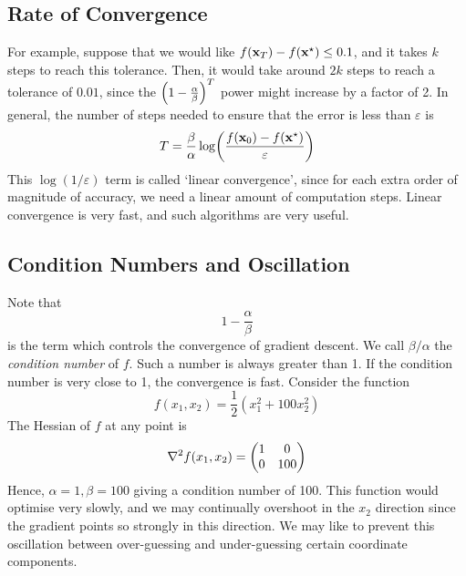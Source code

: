 \subsection{Rate of Convergence}
For example, suppose that we would like \(f(\vb x_T)  - f(\vb x^\star) \leq 0.1\), and it takes \(k\) steps to reach this tolerance.
Then, it would take around \(2k\) steps to reach a tolerance of \(0.01\), since the \(\qty(1 - \frac{\alpha}{\beta})^T\) power might increase by a factor of 2.
In general, the number of steps needed to ensure that the error is less than \(\varepsilon\) is
\[
	T = \frac{\beta}{\alpha} \log(\frac{f(\vb x_0) - f(\vb x^\star)}{\varepsilon})
\]
This \(\log(1/\varepsilon)\) term is called `linear convergence', since for each extra order of magnitude of accuracy, we need a linear amount of computation steps.
Linear convergence is very fast, and such algorithms are very useful.

\subsection{Condition Numbers and Oscillation}
Note that
\[
	1 - \frac{\alpha}{\beta}
\]
is the term which controls the convergence of gradient descent.
We call \(\beta/\alpha\) the \textit{condition number} of \(f\).
Such a number is always greater than 1.
If the condition number is very close to 1, the convergence is fast.
Consider the function
\[
	f(x_1, x_2) = \frac{1}{2}(x_1^2 + 100x_2^2)
\]
The Hessian of \(f\) at any point is
\[
	\laplacian{f(x_1, x_2)} = \begin{pmatrix}
		1 & 0 \\ 0 & 100
	\end{pmatrix}
\]
Hence, \(\alpha = 1, \beta = 100\) giving a condition number of 100.
This function would optimise very slowly, and we may continually overshoot in the \(x_2\) direction since the gradient points so strongly in this direction.
We may like to prevent this oscillation between over-guessing and under-guessing certain coordinate components.

